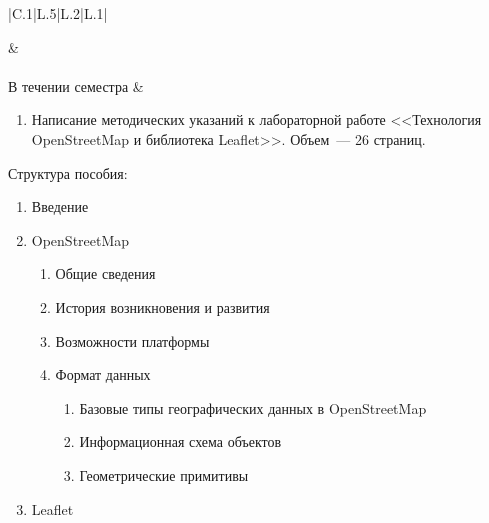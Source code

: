 \documentclass[a4paper, 14pt]{extreport}
\begin{document}
\begin{center}
\begin{tabular}{|C{.1}|L{.5}|L{.2}|L{.1}|}
\begin{enumerate}[leftmargin=0pt,itemindent=*]
              \end{enumerate} & \\ \hline
             \\ \hline
            В течении семестра
            & \begin{enumerate}[leftmargin=0pt,itemindent=*,label=3.\arabic*]\itemsep-5pt
                \vspace*{-.5em}
                \item Написание методических указаний к лабораторной работе <<Технология OpenStreetMap и библиотека Leaflet>>. Объем~--- 26 страниц.
              \vspace*{-2.1em}
              \end{enumerate}
              \singlespacing
              Структура пособия:
              \begin{enumerate}[leftmargin=5pt,itemindent=*,label=\arabic*)]\itemsep-5pt
                \vspace*{-.8em}
                \item Введение
                \item OpenStreetMap
                \begin{enumerate}[leftmargin=10pt,itemindent=*,label=\arabic*)]\itemsep-5pt
                  \vspace*{-1em}
                  \item Общие сведения
                  \item История возникновения и развития
                  \item Возможности платформы
                  \item Формат данных
                  \begin{enumerate}[leftmargin=15pt,itemindent=*,label=\arabic*)]\itemsep-2pt
                    \vspace*{-.6em}
                    \item Базовые типы географических данных в OpenStreetMap
                    \item Информационная схема объектов
                    \item Геометрические примитивы
                  \end{enumerate}
                \vspace*{-.8em}
                \end{enumerate}
                \item Leaflet
                \begin{enumerate}[leftmargin=10pt,itemindent=*,label=\arabic*)]\itemsep-5pt

\end{enumerate}
\end{enumerate}
\end{tabular}
\end{center}
\end{document}
